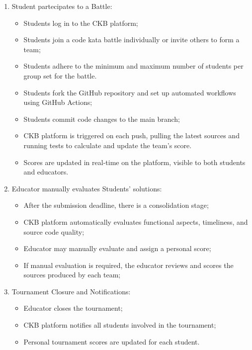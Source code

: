 \begin{enumerate}
    \item Student partecipates to a Battle:
        \begin{itemize}
            \item Students log in to the CKB platform;
            \item Students join a code kata battle individually or invite others to form a team;
            \item Students adhere to the minimum and maximum number of students per group set for the battle.
            \item Students fork the GitHub repository and set up automated workflows using GitHub Actions;
            \item Students commit code changes to the main branch;
            \item CKB platform is triggered on each push, pulling the latest sources and running tests to calculate and update the team's score.
            \item Scores are updated in real-time on the platform, visible to both students and educators.
        \end{itemize}

    \item Educator manually evaluates Students' solutions:
        \begin{itemize}
            \item After the submission deadline, there is a consolidation stage;
            \item CKB platform automatically evaluates functional aspects, timeliness, and source code quality;
            \item Educator may manually evaluate and assign a personal score;
            \item If manual evaluation is required, the educator reviews and scores the sources produced by each team;
        \end{itemize}

    \item Tournament Closure and Notifications:
        \begin{itemize}
            \item Educator closes the tournament;
            \item CKB platform notifies all students involved in the tournament;
            \item Personal tournament scores are updated for each student.
        \end{itemize}


\end{enumerate}
